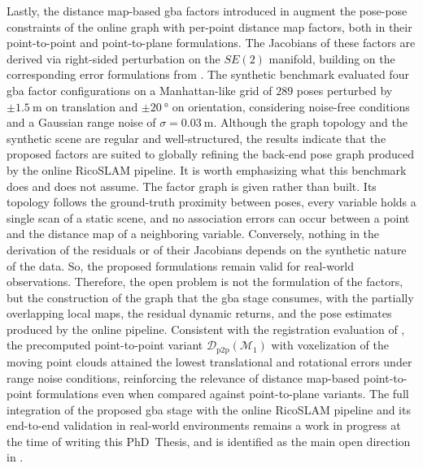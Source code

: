 Lastly, the distance map-based \gls{gba} factors introduced in
 augment the pose-pose constraints of the online
graph with per-point distance map factors, both in their
point-to-point and point-to-plane formulations. The Jacobians of
these factors are derived via right-sided perturbation on the
$SE(2)$ manifold, building on the corresponding error formulations
from . The synthetic benchmark evaluated
four \gls{gba} factor configurations on a Manhattan-like grid of
$289$ poses perturbed by $\pm\SI{1.5}{\metre}$ on translation and
$\pm\SI{20}{\degree}$ on orientation, considering noise-free
conditions and a Gaussian range noise of
$\sigma = \SI{0.03}{\metre}$. Although the graph topology and the
synthetic scene are regular and well-structured, the results
indicate that the proposed factors are suited to globally refining
the back-end pose graph produced by the online RicoSLAM pipeline.
It is worth emphasizing what this benchmark does and does not assume.
The factor graph is given rather than built. Its topology follows the
ground-truth proximity between poses, every variable holds a single
scan of a static scene, and no association errors can occur between a point
and the distance map of a neighboring variable.
Conversely, nothing in the derivation of the residuals or of their Jacobians
depends on the synthetic nature of the data. So, the proposed formulations
remain valid for real-world observations.
Therefore, the open problem is not the formulation of the factors, but the
construction of the graph that the \gls{gba} stage consumes, with the
partially overlapping local maps, the residual dynamic returns, and the
pose estimates produced by the online pipeline.
Consistent with the registration evaluation of
, the precomputed point-to-point variant
$\mathcal{D}_\mathrm{p2p}(\mathcal{M}_1)$ with voxelization of the
moving point clouds attained the lowest translational and rotational
errors under range noise conditions, reinforcing the relevance of
distance map-based point-to-point formulations even when compared
against point-to-plane variants. The full integration of the
proposed \gls{gba} stage with the online RicoSLAM pipeline and its
end-to-end validation in real-world environments remains a work in
progress at the time of writing this PhD~Thesis, and is identified as
the main open direction in .

